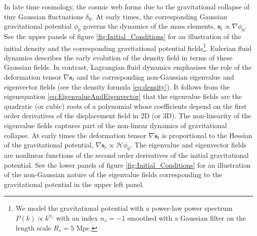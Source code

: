 \documentclass[a4paper, 11pt]{article}
\begin{document}
In late time cosmology, the cosmic web forms due to the gravitational collapse of tiny Gaussian fluctuations $\delta_0$. At early times, the corresponding Gaussian gravitational potential $\phi_0$ governs the dynamics of the mass elements, $\bm{s}_t \propto \nabla \phi_0$. See the upper panels of figure \ref{fig:Initial_Conditions} for an illustration of the initial density and the corresponding gravitational potential fields\footnote{We model the gravitational potential with a power-law power spectrum $P(k) \propto k^{n_s}$ with an index $n_s=-1$ smoothed with a Gaussian filter on the length scale $R_s=5\text{ Mpc}$.}. Eulerian fluid dynamics describes the early evolution of the density field in terms of these Gaussian fields. In contrast, Lagrangian fluid dynamics emphasises the role of the deformation tensor $\nabla \bm{s}_t$ and the corresponding non-Gaussian eigenvalue and eigenvector fields (see the density formula \eqref{eq:density}). It follows from the eigenequation \eqref{eq:EigenvalueAndEigenvector} that the eigenvalue fields are the quadratic (or cubic) roots of a polynomial whose coefficients depend on the first order derivatives of the displacement field in 2D (or 3D). The non-linearity of the eigenvalue fields captures part of the non-linear dynamics of gravitational collapse. At early times the deformation tensor $\nabla \bm{s}_t$ is proportional to the Hessian of the gravitational potential, $\nabla \bm{s}_t \propto \mathcal{H}\phi_0$. The eigenvalue and eigenvector fields are nonlinear functions of the second order derivatives of the initial gravitational potential. See the lower panels of figure \ref{fig:Initial_Conditions} for an illustration of the non-Gaussian nature of the eigenvalue fields corresponding to the gravitational potential in the upper left panel. 
\end{document}
